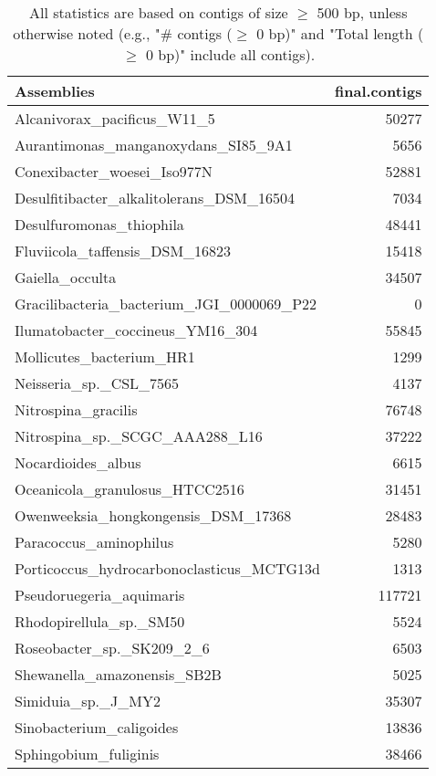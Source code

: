 \documentclass[12pt,a4paper]{article}
\begin{document}
\begin{table}[ht]
\begin{center}
\caption{All statistics are based on contigs of size $\geq$ 500 bp, unless otherwise noted (e.g., "\# contigs ($\geq$ 0 bp)" and "Total length ($\geq$ 0 bp)" include all contigs).}
\begin{tabular}{|l*{1}{|r}|}
\hline
Assemblies & final.contigs \\ \hline
Alcanivorax\_pacificus\_W11\_5 & 50277 \\ \hline
Aurantimonas\_manganoxydans\_SI85\_9A1 & 5656 \\ \hline
Conexibacter\_woesei\_Iso977N & 52881 \\ \hline
Desulfitibacter\_alkalitolerans\_DSM\_16504 & 7034 \\ \hline
Desulfuromonas\_thiophila & 48441 \\ \hline
Fluviicola\_taffensis\_DSM\_16823 & 15418 \\ \hline
Gaiella\_occulta & 34507 \\ \hline
Gracilibacteria\_bacterium\_JGI\_0000069\_P22 & 0 \\ \hline
Ilumatobacter\_coccineus\_YM16\_304 & 55845 \\ \hline
Mollicutes\_bacterium\_HR1 & 1299 \\ \hline
Neisseria\_sp.\_CSL\_7565 & 4137 \\ \hline
Nitrospina\_gracilis & 76748 \\ \hline
Nitrospina\_sp.\_SCGC\_AAA288\_L16 & 37222 \\ \hline
Nocardioides\_albus & 6615 \\ \hline
Oceanicola\_granulosus\_HTCC2516 & 31451 \\ \hline
Owenweeksia\_hongkongensis\_DSM\_17368 & 28483 \\ \hline
Paracoccus\_aminophilus & 5280 \\ \hline
Porticoccus\_hydrocarbonoclasticus\_MCTG13d & 1313 \\ \hline
Pseudoruegeria\_aquimaris & 117721 \\ \hline
Rhodopirellula\_sp.\_SM50 & 5524 \\ \hline
Roseobacter\_sp.\_SK209\_2\_6 & 6503 \\ \hline
Shewanella\_amazonensis\_SB2B & 5025 \\ \hline
Simiduia\_sp.\_J\_MY2 & 35307 \\ \hline
Sinobacterium\_caligoides & 13836 \\ \hline
Sphingobium\_fuliginis & 38466 \\ \hline

\end{tabular}
\end{center}
\end{table}
\end{document}
